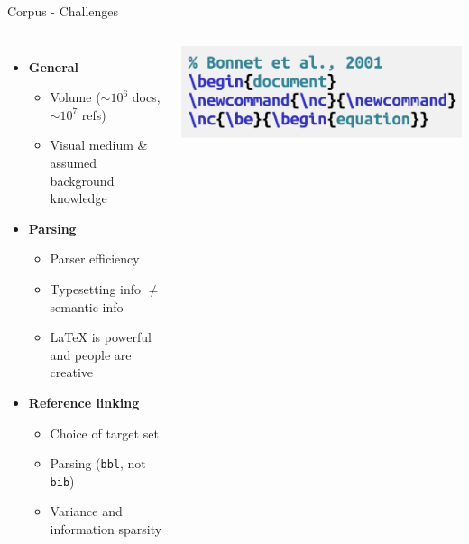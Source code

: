 \documentclass[en,16:9,smallfoot]{sdqbeamer}
\begin{document}

   \begin{frame}{Corpus - Challenges}
   \begin{columns}
        \begin{itemize}
            \item \textbf{General}
            \begin{itemize}
                \item Volume ($\sim10^6$ docs, $\sim10^7$ refs)
                \item Visual medium \& assumed background knowledge  %
            \end{itemize}
            \item \textbf{Parsing}
            \begin{itemize}
                \item Parser efficiency
                \item Typesetting info $\neq$ semantic info %
                \item \LaTeX{} is powerful and people are creative
            \end{itemize}
            \item \textbf{Reference linking}
            \begin{itemize}
                \item Choice of target set
                \item Parsing {\color{contextgrey}(\texttt{bbl}, not \texttt{bib})}
                \item Variance and information sparsity
            \end{itemize}
        \end{itemize}
          \centering
          \includegraphics[width=0.7\linewidth]{imgs/renewcommand_v2}


\end{columns}
\end{frame}
\end{document}
